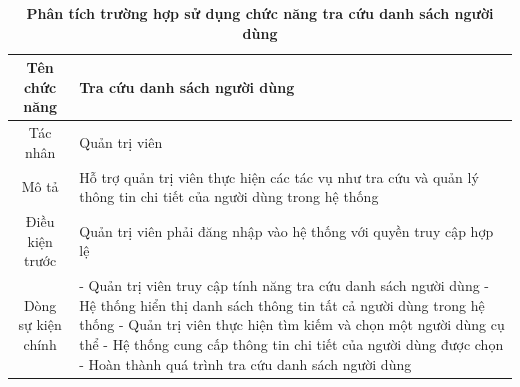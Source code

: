 \begin{table}[H]
	\caption{\bfseries \fontsize{12pt}{0pt}\selectfont Phân tích trường hợp sử dụng chức năng tra cứu danh sách người dùng}
	\centering
	\begin{tabularx}{0.9\textwidth}{|c|X|}
		\hline
		\textbf{Tên chức năng} & \textbf{Tra cứu danh sách người dùng}                                                                             \\
		\hline
		Tác nhân               & Quản trị viên                                                                                                     \\
		\hline
		Mô tả                  & Hỗ trợ quản trị viên thực hiện các tác vụ như tra cứu và quản lý thông tin chi tiết của người dùng trong hệ thống \\
		\hline
		Điều kiện trước        & Quản trị viên phải đăng nhập vào hệ thống với quyền truy cập hợp lệ                                               \\
		\hline
		Dòng sự kiện chính     &
		- Quản trị viên truy cập tính năng tra cứu danh sách người dùng \newline
		- Hệ thống hiển thị danh sách thông tin tất cả người dùng trong hệ thống \newline
		- Quản trị viên thực hiện tìm kiếm và chọn một người dùng cụ thể \newline
		- Hệ thống cung cấp thông tin chi tiết của người dùng được chọn \newline
		- Hoàn thành quá trình tra cứu danh sách người dùng                                                                                        \\
		\hline
	\end{tabularx}
\end{table}


